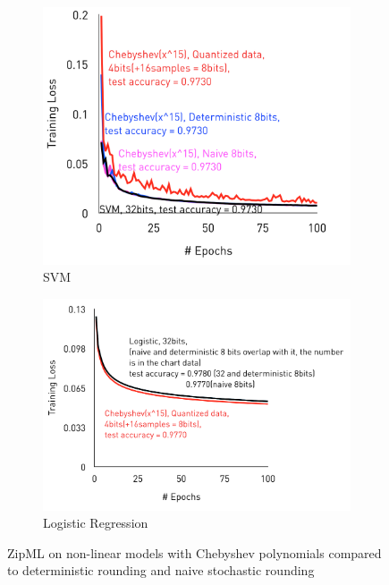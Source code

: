 \documentclass{article}
\begin{document}
\begin{figure}[h]
\centering
    \begin{subfigure}[h]{.4\columnwidth}
    \includegraphics[width=\columnwidth]{final-experiments/VsNaive-SVM} 
    \caption{SVM}
    \end{subfigure}
    \begin{subfigure}[h]{.4\columnwidth}
    \includegraphics[width=\columnwidth]{final-experiments/VsNaive-LR} 
    \caption{Logistic Regression}
    \end{subfigure}
\caption{ZipML on non-linear models with Chebyshev polynomials compared to deterministic rounding and naive stochastic rounding}
\label{fig:vsnaive}
\end{figure}
\end{document}
